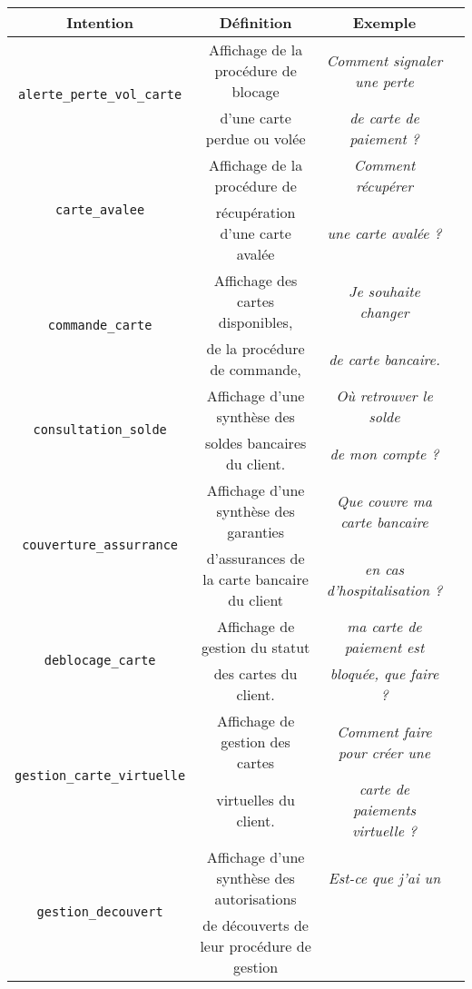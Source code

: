 	\begin{table}[!htb]
		\begin{center}
		\begin{scriptsize}
		\begin{tabular}{|c|c|c|c|}
		
			\hline
			\rowcolor{colorTableHeader!15}
			\textbf{Intention}
				& \textbf{Définition}
				& \textbf{Exemple}
				\tabularnewline
				\hline
			\multirow{2}{*}{\texttt{alerte\_perte\_vol\_carte}}
				& Affichage de la procédure de blocage
				& \textit{Comment signaler une perte}
				\tabularnewline
				& d'une carte perdue ou volée
				& \textit{de carte de paiement ?}
				\tabularnewline
				\hline
			\multirow{2}{*}{\texttt{carte\_avalee}}
				& Affichage de la procédure de
				& \textit{Comment récupérer}
				\tabularnewline
				& récupération d'une carte avalée
				& \textit{une carte avalée ?}
				\tabularnewline
				\hline
			\multirow{2}{*}{\texttt{commande\_carte}}
				& Affichage des cartes disponibles,
				& \textit{Je souhaite changer}
				\tabularnewline
				& de la procédure de commande,
				& \textit{de carte bancaire.}
				\tabularnewline
				\hline
			\multirow{2}{*}{\texttt{consultation\_solde}}
				& Affichage d'une synthèse des
				& \textit{Où retrouver le solde}
				\tabularnewline
				& soldes bancaires du client.
				& \textit{ de mon compte ?}
				\tabularnewline
				\hline
			\multirow{2}{*}{\texttt{couverture\_assurrance}}
				& Affichage d'une synthèse des garanties
				& \textit{Que couvre ma carte bancaire}
				\tabularnewline
				& d'assurances de la carte bancaire du client
				& \textit{en cas d'hospitalisation ?}
				\tabularnewline
				\hline
			\multirow{2}{*}{\texttt{deblocage\_carte}}
				& Affichage de gestion du statut
				& \textit{ma carte de paiement est}
				\tabularnewline
				& des cartes du client.
				& \textit{bloquée, que faire ?}
				\tabularnewline
				\hline
			\multirow{2}{*}{\texttt{gestion\_carte\_virtuelle}}
				& Affichage de gestion des cartes
				& \textit{Comment faire pour créer une}
				\tabularnewline
				& virtuelles du client.
				& \textit{carte de paiements virtuelle ?}
				\tabularnewline
				\hline
			\multirow{2}{*}{\texttt{gestion\_decouvert}}
				& Affichage d'une synthèse des autorisations
				& \textit{Est-ce que j'ai un}
				\tabularnewline
				& de découverts de leur procédure de gestion

\end{tabular}
\end{scriptsize}
\end{center}
\end{table}
